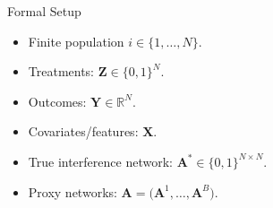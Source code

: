 \documentclass{beamer}
\def \bZ {\textbf{Z}}
\def \bA {\textbf{A}}
\def \bX {\textbf{X}}
\def \bY {\textbf{Y}}
\begin{document}
    \begin{frame}{Formal Setup}
        \large 
        \begin{itemize}
            \item Finite population $i \in \{1,\ldots, N\}$.
            \vspace{0.2cm}
            \item Treatments: $\bZ \in \{0,1\}^N$.
            \vspace{0.2cm}
            \item Outcomes: $\bY \in \mathbb{R}^N$.
            \vspace{0.2cm}
            \item Covariates/features: $\bX$.
            \vspace{0.2cm}
            \item True interference network: $\bA^\ast \in \{0,1\}^{N \times N}$.
            \vspace{0.2cm}
            \item Proxy networks: $\bA=\big(\bA^1,\ldots,\bA^B\big)$.
        \end{itemize}
    \end{frame}
\end{document}
